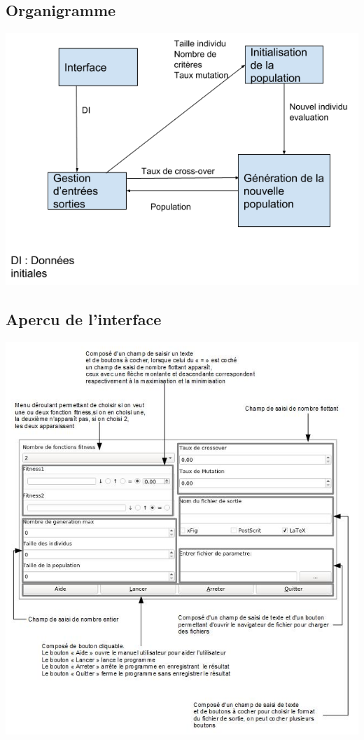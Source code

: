 \documentclass[a4paper,11pt]{article}
\begin{document}
		\subsection{Organigramme}
		\centerline{\includegraphics{OrganigrammeV7.png}}
		
		\subsection{Apercu de l'interface}
		\centerline{\includegraphics{InterfaceExpliquer.png}}
	
\end{document}
